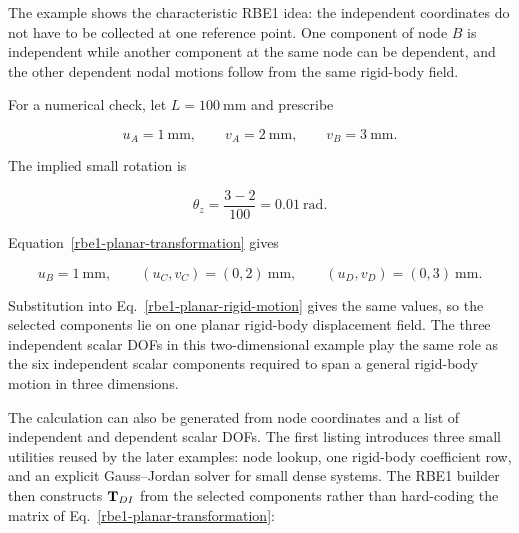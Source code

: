 The example shows the characteristic RBE1 idea: the independent coordinates do
not have to be collected at one reference point. One component of node $B$ is
independent while another component at the same node can be dependent, and the
other dependent nodal motions follow from the same rigid-body field.

For a numerical check, let $L=100~\mathrm{mm}$ and prescribe

\begin{equation}
    u_A=1~\mathrm{mm},\qquad
    v_A=2~\mathrm{mm},\qquad
    v_B=3~\mathrm{mm}.
\end{equation}

The implied small rotation is

\begin{equation}
    \theta_z=\frac{3-2}{100}=0.01~\mathrm{rad}.
\end{equation}

Equation~\eqref{rbe1-planar-transformation} gives

\begin{equation}
    u_B=1~\mathrm{mm},\qquad
    (u_C,v_C)=(0,2)~\mathrm{mm},\qquad
    (u_D,v_D)=(0,3)~\mathrm{mm}.
\end{equation}

Substitution into Eq.~\eqref{rbe1-planar-rigid-motion} gives the same values,
so the selected components lie on one planar rigid-body displacement field. The
three independent scalar DOFs in this two-dimensional example play the same role
as the six independent scalar components required to span a general rigid-body
motion in three dimensions.

The calculation can also be generated from node coordinates and a list of
independent and dependent scalar DOFs. The first listing introduces three small
utilities reused by the later examples: node lookup, one rigid-body coefficient
row, and an explicit Gauss--Jordan solver for small dense systems. The RBE1
builder then constructs $\mathbf{T}_{DI}$ from the selected components rather than
hard-coding the matrix of Eq.~\eqref{rbe1-planar-transformation}:

